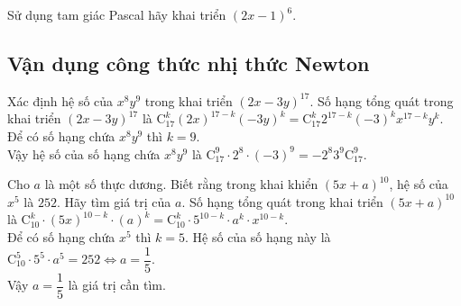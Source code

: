 \begin{vd}%
	Sử dụng tam giác Pascal hãy khai triển  $\left(2x-1\right)^6$.
\end{vd}

\subsection{Vận dụng công thức nhị thức Newton}

\begin{vd}%
	Xác định hệ số của $x^8y^9$ trong khai triển  $(2x-3y)^{17}$.
	\loigiai
	{		
		Số hạng tổng quát trong khai triển $(2x-3y)^{17}$ là
		$\mathrm{C}_{17}^k(2x)^{17-k}(-3y)^k=\mathrm{C}_{17}^k2^{17-k}(-3)^kx^{17-k}y^k$.\\
		Để có số hạng chứa $x^8y^9$ thì $k=9$.\\
		Vậy hệ số của số hạng chứa $x^8y^9$ là $\mathrm{C}_{17}^9\cdot 2^8\cdot (-3)^9=-2^8 3^9\mathrm{C}_{17}^9$.
	}
\end{vd}

\begin{vd}%
	Cho $a$ là một số thực dương. Biết rằng trong khai khiển $(5x+a)^{10}$, hệ số của $x^5$ là $252$. Hãy tìm giá trị của $a$.
	\loigiai
	{		
		Số hạng tổng quát trong khai triển $(5x+a)^{10}$ là
		$\mathrm{C}_{10}^k\cdot (5x)^{10-k}\cdot (a)^k=\mathrm{C}_{10}^k\cdot 5^{10-k}\cdot a^k\cdot x^{10-k}$.\\
		Để có số hạng chứa $x^5$ thì $k=5$. Hệ số của số hạng này là $ \mathrm{C}_{10}^5\cdot 5^5\cdot a^5=252\Leftrightarrow a=\dfrac{1}{5}$.\\
		Vậy $a=\dfrac{1}{5}$ là giá trị cần tìm.
	}
\end{vd}

